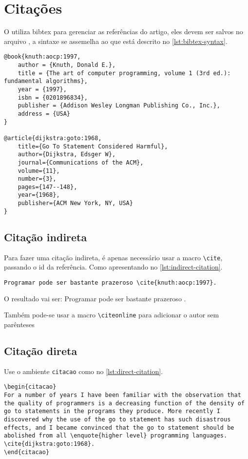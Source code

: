 \section{Citações}

O \template utiliza bibtex para gerenciar as referências do artigo, eles devem ser salvos no arquivo \bibfile, a sintaxe se assemelha ao que está descrito no \autoref{lst:bibtex-syntax}.

\begin{lstlisting}[float=htb, style=latexStyle, caption={Sintaxe bibtex}, label=lst:bibtex-syntax]
@book{knuth:aocp:1997,
	author = {Knuth, Donald E.},
	title = {The art of computer programming, volume 1 (3rd ed.): fundamental algorithms},
	year = {1997},
	isbn = {0201896834},
	publisher = {Addison Wesley Longman Publishing Co., Inc.},
	address = {USA}
}

@article{dijkstra:goto:1968,
	title={Go To Statement Considered Harmful},
	author={Dijkstra, Edsger W},
	journal={Communications of the ACM},
	volume={11},
	number={3},
	pages={147--148},
	year={1968},
	publisher={ACM New York, NY, USA}
}
\end{lstlisting}

\subsection{Citação indireta}

Para fazer uma citação indireta, é apenas necessário usar a macro \texttt{\textbackslash cite}, passando o id da referência. Como apresentando no \autoref{lst:indirect-citation}.

\begin{lstlisting}[float=htb, style=latexStyle, caption={Citação indireta}, label=lst:indirect-citation]
Programar pode ser bastante prazeroso \cite{knuth:aocp:1997}.
\end{lstlisting}

O resultado vai ser: Programar pode ser bastante prazeroso \cite{knuth:aocp:1997}.

Também pode-se usar a macro \texttt{\textbackslash citeonline} para adicionar o autor sem parênteses

\subsection{Citação direta}

Use o ambiente \texttt{citacao} como no \autoref{lst:direct-citation}.

\begin{lstlisting}[float=htb, style=latexStyle, caption={Citação direta}, label=lst:direct-citation]
\begin{citacao}
For a number of years I have been familiar with the observation that 
the quality of programmers is a decreasing function of the density of 
go to statements in the programs they produce. More recently I 
discovered why the use of the go to statement has such disastrous 
effects, and I became convinced that the go to statement should be 
abolished from all \enquote{higher level} programming languages. 
\cite{dijkstra:goto:1968}.
\end{citacao}
\end{lstlisting}

